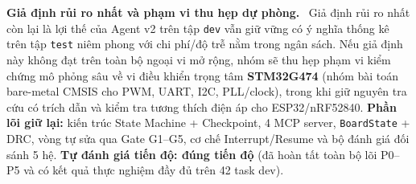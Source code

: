 \documentclass[12pt,a4paper]{report}
\newcommand{\file}[1]{{\small\ttfamily\color{bkblue}\nolinkurl{#1}}}
\newcommand{\subhead}[1]{\par\smallskip\noindent\textbf{#1}\ }
\begin{document}
\par\vspace{2pt}
\subhead{Giả định rủi ro nhất và phạm vi thu hẹp dự phòng.} Giả định rủi ro nhất còn lại là lợi thế của Agent v2 trên tập \file{dev} vẫn giữ vững có ý nghĩa thống kê trên tập \file{test} niêm phong với chi phí/độ trễ nằm trong ngân sách. Nếu giả định này không đạt trên toàn bộ ngoại vi mở rộng, nhóm sẽ thu hẹp phạm vi kiểm chứng mô phỏng sâu về vi điều khiển trọng tâm \textbf{STM32G474} (nhóm bài toán bare-metal CMSIS cho PWM, UART, I2C, PLL/clock), trong khi giữ nguyên tra cứu có trích dẫn và kiểm tra tương thích điện áp cho ESP32/nRF52840. \textbf{Phần lõi giữ lại:} kiến trúc State Machine + Checkpoint, 4 MCP server, \file{BoardState} + DRC, vòng tự sửa qua Gate G1–G5, cơ chế Interrupt/Resume và bộ đánh giá đối sánh 5 hệ. \textbf{Tự đánh giá tiến độ: đúng tiến độ} (đã hoàn tất toàn bộ lõi P0–P5 và có kết quả thực nghiệm đầy đủ trên 42 task dev).
\end{document}
